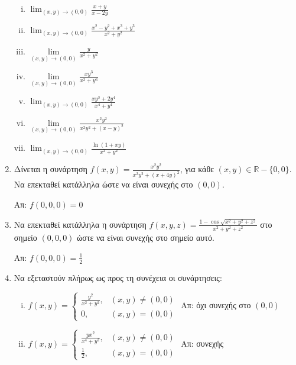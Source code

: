\begin{enumerate}
        \begin{enumerate}[i)]
            \item $ \lim_{(x,y)\to (0,0)} \frac{ x + y }{ x - 2y } $ 
            \item $ \lim_{(x,y)\to (0,0)} \frac{ x^{2}-y^{2}+x^{3}+y^{3} }
                { x^{2}+y^{2} } $ 
            \item $ \lim\limits_{(x,y)\to (0, 0)} \frac{y}{x^{2}+y^{2}} $  
            \item $ \lim\limits_{(x,y)\to (0, 0)} \frac{xy^{3}}{x^{2}+y^{6}} $
            \item $ \lim_{(x,y)\to (0,0)} \frac{ xy^{3} + 2y^{4} }{ x^{4}+y^{4}}  $
            \item $\lim\limits_{(x,y)\to (0,0)}\frac{x^{2}y^{2}}{x^{2}y^{2}+(x-y)^{2}}$ 
            \item $ \lim_{(x,y)\to (0,0)} \frac{ \ln{( 1+xy )} }{ x^{2}+y^{2} }  $
        \end{enumerate}

    \item Δίνεται η συνάρτηση $f(x,y)=\frac{x^{2}y^{2}}{x^{2}y^{2}+(x+4y)^{2}}$, 
        για κάθε $(x,y)\in \mathbb{R}-\{0,0\}$. Να επεκταθεί κατάλληλα ώστε να 
        είναι συνεχής στο $(0,0)$.

        \hfill Απ: $ f(0,0,0) = 0 $

    \item Να επεκταθεί κατάλληλα η συνάρτηση $ f(x,y,z) = \frac{1 - 
            \cos{\sqrt{x^{2}+y^{2}+z^{2}}}}{x^{2}+y^{2}+z^{2}} $ στο σημείο 
            $ (0,0,0) $ ώστε να είναι συνεχής στο σημείο αυτό.

        \hfill Απ: $ f(0,0,0)= \frac{ 1 }{ 2 } $

    \item Να εξεταστούν πλήρως ως προς τη συνέχεια οι συνάρτησεις:
        \begin{enumerate}[i)]
            \item $ f(x,y) = \begin{cases} \frac{y^{2}}{x^{2}+y^{2}}, & (x,y) 
        \neq (0,0) \\ 0, & (x,y) = (0,0)\end{cases} $
        \hfill Απ: όχι συνεχής στο $ (0,0) $ 

    \item $ f(x,y) = 
        \begin{cases}
            \frac{yx^{2}}{x^{4}+y^{2}}, & (x,y) \neq (0,0) \\ 
            \frac{1}{2}, & (x,y) = (0,0) 
        \end{cases} $
        \hfill Απ: συνεχής 


\end{enumerate}
\end{enumerate}
